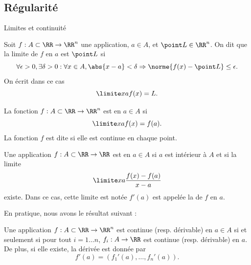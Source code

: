 \subsection{Régularité}
\begin{frame}{Limites et continuité}
  \begin{definition}
    Soit \(f : A \subset \RR \to \RR^{n}\) une application, \(a \in A\), et \(\point L \in \RR^{n}\).\pause{}
    On dit que la limite de \(f\) en \(a\) est \(\point L\) si\pause{}
    \begin{equation*}
      \forall \epsilon > 0, \exists \delta  > 0 : \forall x \in A, \abs{x-a} < \delta \Rightarrow \norme{f(x)-\point L} \leq \epsilon.
    \end{equation*}\pause{}
    On écrit dans ce cas
    \begin{equation*}
      \limite x a f(x) = L.
    \end{equation*}\pause{}
  \end{definition}
  \begin{definition}
    La fonction \(f : A \subset \RR \to \RR^{n}\)\pause{} est  en \(a\in A\) si\pause{}
    \begin{equation*}
      \limite x a f(x) = f(a).
    \end{equation*}\pause{}
    La fonction \(f\) est dite  si elle est continue en chaque point.
  \end{definition}
\end{frame}
\begin{frame}
  \begin{definition}
    Une application \(f : A \subset \RR \to \RR\) est  en \(a \in A\) si\pause{} \(a\) est intérieur à \(A\) et\pause{} si la limite
    \begin{equation*}
      \limite x a \frac{f(x)-f(a)}{x-a}
    \end{equation*}
    existe. \pause{}Dans ce cas, cette limite est notée \(f'(a)\) est appelée la  de \(f\) en \(a\).
  \end{definition}\pause{}

  En pratique, nous avons le résultat suivant :\pause{}
  \begin{proposition}
    Une application \(f : A \subset \RR \to \RR^{n}\) est continue\pause{} (resp. dérivable)\pause{} en \(a \in A\)\pause{} si et seulement si pour tout \(i = 1 \ldots n\), \(f_{i} : A \to \RR\) est continue (resp. dérivable) en \(a\).\pause{} De plus, si elle existe, la dérivée est donnée par
    \begin{equation*}
      f'(a) = (f_{1}'(a), \ldots,f_{n}'(a)).
    \end{equation*}
  \end{proposition}
\end{frame}

